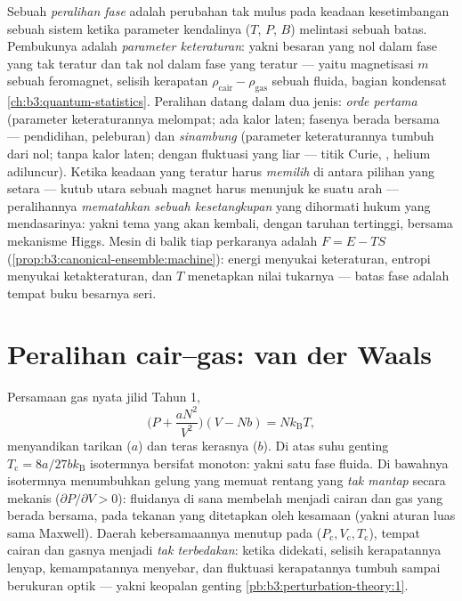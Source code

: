 \begin{definition}\label{def:b3:phase-transitions:order}
Sebuah \emph{peralihan fase} adalah perubahan tak mulus pada keadaan
kesetimbangan sebuah sistem ketika parameter kendalinya ($T$, $P$, $B$)
melintasi sebuah batas. Pembukunya adalah \emph{parameter keteraturan}:
yakni besaran yang nol dalam fase yang tak teratur dan tak nol dalam fase
yang teratur --- yaitu magnetisasi $m$ sebuah feromagnet, selisih
kerapatan $\rho_{\text{cair}} - \rho_{\text{gas}}$ sebuah fluida, bagian
kondensat \cref{ch:b3:quantum-statistics}. Peralihan datang dalam
dua jenis: \emph{orde pertama} (parameter keteraturannya melompat; ada
kalor laten; fasenya berada bersama --- pendidihan, peleburan) dan
\emph{sinambung} (parameter keteraturannya tumbuh dari nol; tanpa kalor
laten; dengan fluktuasi yang liar --- titik Curie, , helium
adiluncur). Ketika keadaan yang teratur harus \emph{memilih} di antara
pilihan yang setara --- kutub utara sebuah magnet harus menunjuk ke suatu
arah --- peralihannya \emph{mematahkan sebuah kesetangkupan} yang dihormati
hukum yang mendasarinya: yakni tema yang akan kembali, dengan taruhan
tertinggi, bersama mekanisme Higgs.
Mesin di balik tiap perkaranya adalah  $F = E - TS$
(\cref{prop:b3:canonical-ensemble:machine}): energi menyukai keteraturan,
entropi menyukai ketakteraturan, dan $T$ menetapkan nilai tukarnya ---
batas fase adalah tempat buku besarnya seri.
\end{definition}

\section{Peralihan cair--gas: van der Waals}

\begin{proposition}\label{prop:b3:phase-transitions:vdw}
Persamaan gas nyata jilid Tahun 1,
\[
\Big(P + \frac{aN^2}{V^2}\Big)(V - Nb) = Nk_{\text{B}}T ,
\]
menyandikan tarikan ($a$) dan teras kerasnya ($b$). Di atas suhu
genting $T_{\text{c}} = 8a/27bk_{\text{B}}$ isotermnya bersifat
monoton: yakni satu fase fluida. Di bawahnya isotermnya menumbuhkan
gelung yang memuat rentang yang \emph{tak mantap} secara mekanis
($\partial P/\partial V >
0$): fluidanya di sana membelah menjadi cairan dan gas yang berada
bersama, pada tekanan yang ditetapkan oleh kesamaan 
(yakni aturan luas sama Maxwell). Daerah kebersamaannya menutup pada  ($P_{\text{c}}, V_{\text{c}}, T_{\text{c}}$), tempat cairan
dan gasnya menjadi \emph{tak terbedakan}: ketika didekati, selisih
kerapatannya lenyap, kemampatannya menyebar, dan fluktuasi kerapatannya
tumbuh sampai berukuran optik --- yakni keopalan genting
\cref{pb:b3:perturbation-theory:1}.
\end{proposition}
\admitted

